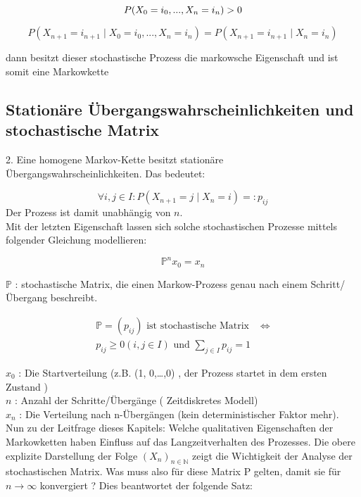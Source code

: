 \documentclass[a4paper]{article}
\begin{document}
\[
	P(X_0 = i_0, ..., X_{n} = i_{n}) > 0 \\
\] 

\[
	P(X_{n+1} = i_{n+1} \; \vert \; X_0 = i_0, ..., X_{n} = i_{n})
	= 
	P(X_{n+1} = i_{n+1} \; \vert \; X_{n} = i_{n})

\] 


dann besitzt dieser stochastische Prozess die markowsche Eigenschaft und ist somit eine Markowkette

\subsection{Stationäre Übergangswahrscheinlichkeiten und stochastische Matrix}

2. Eine homogene Markov-Kette besitzt stationäre Übergangswahrscheinlichkeiten. Das bedeutet:

\[
	\forall i, j \in I: P(X_{n+1} = j \; \vert \; X_n = i) =: p_{ij}
\] 
Der Prozess ist damit unabhängig von $n$.
\\

Mit der letzten Eigenschaft lassen sich solche stochastischen Prozesse mittels folgender Gleichung
modellieren:

\[
	\mathbb{P} ^{n} x_0 = x_n
\] 

$\mathbb{P}$ : stochastische Matrix, die einen Markow-Prozess genau nach einem Schritt/Übergang beschreibt.

\begin{align*}
	\mathbb{P} = \left(
		p_{ij}
	\right) \text{ ist stochastische Matrix } & \Leftrightarrow \\
	p_{ij} \geq 0 \left(
		i, j \in I
	\right) \text{ und }
	\sum_{j \in I} p_{ij} = 1
\end{align*}

$x_0$ : Die Startverteilung (z.B. (1, 0,…,0) , der Prozess startet in dem ersten Zustand ) \\
$n$ : Anzahl der Schritte/Übergänge ( Zeitdiskretes Modell) \\
$x_n$ : Die Verteilung nach n-Übergängen (kein deterministischer Faktor mehr). \\

Nun zu der Leitfrage dieses Kapitels: Welche qualitativen Eigenschaften der Markowketten haben
Einfluss auf das Langzeitverhalten des Prozesses. Die obere explizite Darstellung der Folge
$(X_n)_{n\in \mathbb{N}}$ zeigt die Wichtigkeit der Analyse der stochastischen Matrix. Was muss also für diese
Matrix P gelten, damit sie für $n \rightarrow \infty$ konvergiert ? Dies beantwortet der folgende Satz:
\end{document}
